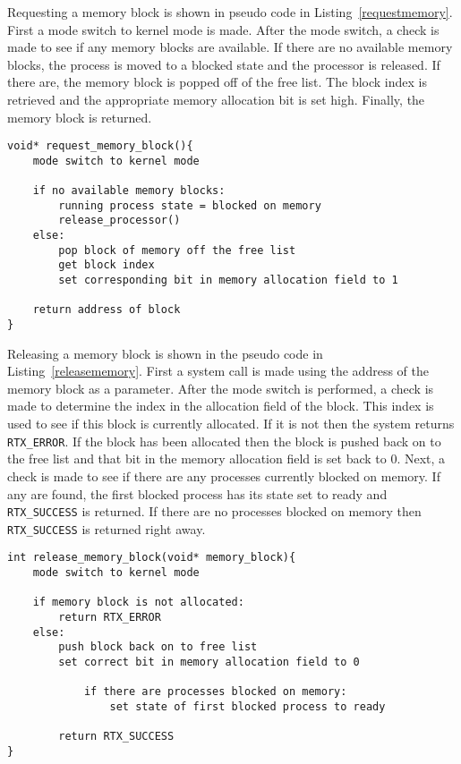 \documentclass[oneside]{article}
\begin{document}
Requesting a memory block is shown in pseudo code in
Listing~\ref{requestmemory}. First a mode switch to kernel mode is made. After
the mode switch, a check is made to see if any memory blocks are available. If
there are no available memory blocks, the process is moved to a blocked state
and the processor is released. If there are, the memory block is popped off of
the free list. The block index is retrieved and the appropriate memory
allocation bit is set high. Finally, the memory block is returned.


\begin{lstlisting}
void* request_memory_block(){
    mode switch to kernel mode

    if no available memory blocks:
        running process state = blocked on memory
        release_processor()
    else:
        pop block of memory off the free list        
        get block index
        set corresponding bit in memory allocation field to 1

    return address of block
}
\end{lstlisting}

Releasing a memory block is shown in the pseudo code in
Listing~\ref{releasememory}. First a system call is made using the address of
the memory block as a parameter.  After the mode switch is performed, a check
is made to determine the index in the allocation field of the block. This index
is used to see if this block is currently allocated. If it is not then the
system returns \texttt{RTX\_ERROR}. If the block has been allocated then the
block is pushed back on to the free list and that bit in the memory allocation
field is set back to 0. Next, a check is made to see if there are any processes
currently blocked on memory. If any are found, the first blocked process has
its state set to ready and \texttt{RTX\_SUCCESS} is returned. If there are no
processes blocked on memory then \texttt{RTX\_SUCCESS} is returned right away.

\begin{lstlisting}
int release_memory_block(void* memory_block){
    mode switch to kernel mode

    if memory block is not allocated:
        return RTX_ERROR
    else:
        push block back on to free list
        set correct bit in memory allocation field to 0

            if there are processes blocked on memory:
                set state of first blocked process to ready

        return RTX_SUCCESS        
}
\end{lstlisting}
\end{document}
